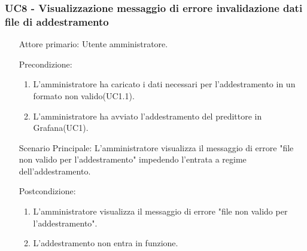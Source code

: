 \subsubsection{UC8 - Visualizzazione messaggio di errore invalidazione dati file di addestramento}
\label{sssec:uc8}
\begin{description}
	\begin{enumerate}
		\item[Attore primario:] Utente amministratore.
		\item[Precondizione:]
		\begin{enumerate}
			\item L'amministratore ha caricato i dati necessari per l'addestramento in un formato non valido(UC1.1).
			\item L'amministratore ha avviato l'addestramento del predittore in Grafana(UC1).
		\end{enumerate}
		\item[Scenario Principale:] L'amministratore visualizza il messaggio di errore "file non valido per l'addestramento" impedendo l'entrata a regime dell'addestramento.
		\item[Postcondizione:]
		\begin{enumerate}
			\item L'amministratore visualizza il messaggio di errore "file non valido per l'addestramento".
			\item L'addestramento non entra in funzione.
		\end{enumerate}
	\end{enumerate}
\end{description}
